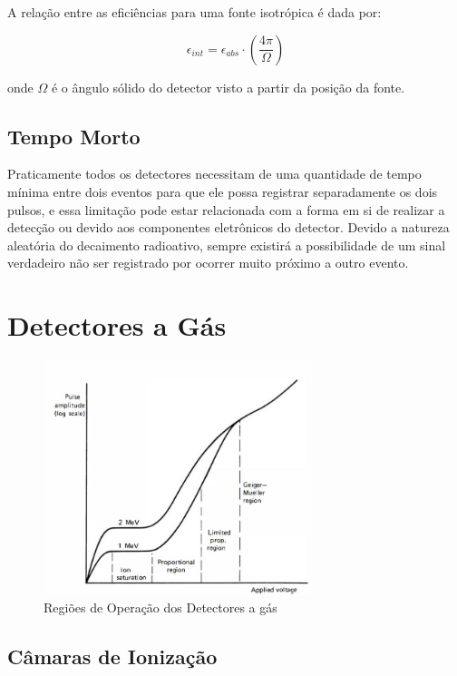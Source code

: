 \documentclass[11pt,a4paper]{article}
\begin{document}
		A relação entre as eficiências para uma fonte isotrópica é dada por:

			\begin{equation}
					\epsilon_{int} = \epsilon_{abs} \cdot \left(\frac{4 \pi}{\Omega}\right)
			\end{equation}

		\noindent onde $\Omega$ é o ângulo sólido do detector visto a partir da posição da fonte.

	\subsection{Tempo Morto}

		Praticamente todos os detectores necessitam de uma quantidade de tempo mínima entre dois eventos para que ele possa registrar separadamente os dois pulsos, e essa limitação pode estar relacionada com a forma em si de realizar a detecção ou devido aos componentes eletrônicos do detector. Devido a natureza aleatória do decaimento radioativo, sempre existirá a possibilidade de um sinal verdadeiro não ser registrado por ocorrer muito próximo a outro evento. 

	\section{Detectores a Gás}

		\begin{figure}[h]
			\centering
			\includegraphics[width=0.7\textwidth]{Imagens/graficoDetectoresAGas.JPG}
			\caption{Regiões de Operação dos Detectores a gás}
			\label{fig:graficoDetectoresAGas}
		\end{figure}
	

	\subsection{Câmaras de Ionização}
\end{document}
